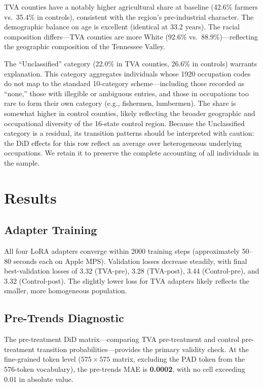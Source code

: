 \documentclass[12pt]{article}
\begin{document}
TVA counties have a notably higher agricultural share at baseline (42.6\% farmers vs.\ 35.4\% in controls), consistent with the region's pre-industrial character. The demographic balance on age is excellent (identical at 33.2 years). The racial composition differs---TVA counties are more White (92.6\% vs.\ 88.9\%)---reflecting the geographic composition of the Tennessee Valley.

The ``Unclassified'' category (22.0\% in TVA counties, 26.6\% in controls) warrants explanation. This category aggregates individuals whose 1920 occupation codes do not map to the standard 10-category scheme---including those recorded as ``none,'' those with illegible or ambiguous entries, and those in occupations too rare to form their own category (e.g., fishermen, lumbermen). The share is somewhat higher in control counties, likely reflecting the broader geographic and occupational diversity of the 16-state control region. Because the Unclassified category is a residual, its transition patterns should be interpreted with caution: the DiD effects for this row reflect an average over heterogeneous underlying occupations. We retain it to preserve the complete accounting of all individuals in the sample.


\section{Results}
\label{sec:results}

\subsection{Adapter Training}

All four LoRA adapters converge within \num{2000} training steps (approximately 50--80 seconds each on Apple MPS). Validation losses decrease steadily, with final best-validation losses of 3.32 (TVA-pre), 3.28 (TVA-post), 3.44 (Control-pre), and 3.32 (Control-post). The slightly lower loss for TVA adapters likely reflects the smaller, more homogeneous population.

\subsection{Pre-Trends Diagnostic}

The pre-treatment DiD matrix---comparing TVA pre-treatment and control pre-treatment transition probabilities---provides the primary validity check. At the fine-grained token level ($575 \times 575$ matrix, excluding the PAD token from the 576-token vocabulary), the pre-trends MAE is \textbf{0.0002}, with no cell exceeding 0.01 in absolute value.
\end{document}
